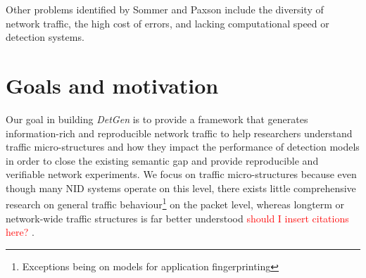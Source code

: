 \documentclass{article}
\begin{document}




\vspace{0.2cm}
Other problems identified by Sommer and Paxson include the diversity of network traffic, the high cost of errors, and lacking computational speed or detection systems.

\section{Goals and motivation}

Our goal in building \textit{DetGen} is to provide a framework that generates information-rich and reproducible network traffic to help researchers understand traffic micro-structures and how they impact the performance of detection models in order to close the existing semantic gap and provide reproducible and verifiable network experiments. We focus on traffic micro-structures because even though many NID systems operate on this level, there exists little comprehensive research on general traffic behaviour\footnote{Exceptions being on models for application fingerprinting} on the packet level, whereas longterm or network-wide traffic structures is far better understood \textcolor{red}{should I insert citations here? \cite{willinger1998self}}.
\end{document}
